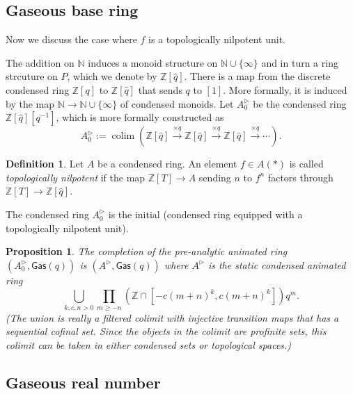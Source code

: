 \documentclass{article}
\theoremstyle{plain}
\newtheorem{prop}[thm]{Proposition}
\theoremstyle{definition}
\newtheorem{defi}[thm]{Definition}
\theoremstyle{remark}
\DeclareMathOperator{\colim}{colim}
\newcommand{\huflag}{\triangleright}
\begin{document}
\subsection{Gaseous base ring}

Now we discuss the case where $ f $ is a topologically nilpotent unit.

The addition on $ \mathbb{N} $ induces a monoid structure on $ \mathbb{N}\cup \{\infty\} $
and in turn a ring strcuture on $ P $,
which we denote by $ \mathbb{Z}[\hat{q}] $.
There is a map from the discrete condensed ring $ \mathbb{Z}[q] $ to $ \mathbb{Z}[\hat{q}] $
that sends $ q $ to $ [1] $.
More formally, it is induced by the map $ \mathbb{N}\to \mathbb{N}\cup \{\infty\} $ of condensed monoids.
Let $ A _{0}^{\huflag} $ be the condensed ring $ \mathbb{Z}[\hat{q}][q ^{-1}]$,
which is more formally constructed as
\begin{equation*}
A _{0}^{\huflag} := \colim (\mathbb{Z}[\hat{q}] \xrightarrow{\times q} \mathbb{Z}[\hat{q}]\xrightarrow{\times q} \mathbb{Z}[\hat{q}]\xrightarrow{\times q} \cdots   ).
\end{equation*}

\begin{defi}
Let $ A $ be a condensed ring. An element $ f \in  A (*) $ is called \emph{topologically nilpotent}
if the map $ \mathbb{Z}[T]\to A $ sending $ n $ to $ f ^{n} $ factors through $ \mathbb{Z}[T]\to \mathbb{Z}[\hat{q}]$.
\end{defi}

The condensed ring $ A _{0}^{\huflag} $ is the initial (condensed ring equipped with a topologically nilpotent unit).

\begin{prop}
The completion of the pre-analytic animated ring
$ (A _{0}^{\huflag}, \mathsf{Gas}(q)) $
is $ (A ^{\huflag}, \mathsf{Gas}(q)) $ where $ A ^{\huflag} $ is the static condensed animated ring
\begin{equation*}
\bigcup _{k,c,n>0} \prod _{m\geq -n} (\mathbb{Z}\cap [-c(m+n) ^{k}, c (m+n)^{k}]) q ^{m}.
\end{equation*}
(The union is really a filtered colimit with injective transition maps that has a sequential cofinal set.
Since the objects in the colimit are profinite sets,
this colimit can be taken in either condensed sets or topological spaces.)
\end{prop}

\subsection{Gaseous real number}
\end{document}
